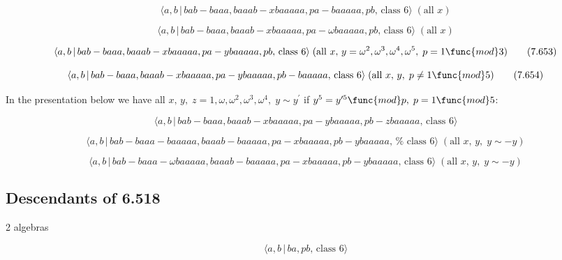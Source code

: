 \documentclass[10pt]{article}
\begin{document}
\begin{equation}
\langle a,b\,|\,bab-baaa,baaab-xbaaaaa,pa-baaaaa,pb,\,\text{class }6\rangle
\;(\text{all }x)  \tag{7.651}
\end{equation}

\begin{equation}
\langle a,b\,|\,bab-baaa,baaab-xbaaaaa,pa-\omega baaaaa,pb,\,\text{class }%
6\rangle \;(\text{all }x)  \tag{7.652}
\end{equation}

\begin{equation}
\langle a,b\,|\,bab-baaa,baaab-xbaaaaa,pa-ybaaaaa,pb,\,\text{class }6\rangle
\;(\text{all }x,\,y=\omega ^{2},\omega ^{3},\omega ^{4},\omega ^{5},\;p=1%
\func{mod}3)  \tag{7.653}
\end{equation}

\begin{equation}
\langle a,b\,|\,bab-baaa,baaab-xbaaaaa,pa-ybaaaaa,pb-baaaaa,\,\text{class }%
6\rangle \;(\text{all }x,\,y,\;p\neq 1\func{mod}5)  \tag{7.654}
\end{equation}

In the presentation below we have all $x,\,y,\;z=1,\omega ,\omega
^{2},\omega ^{3},\omega ^{4},\;y\sim y^{\prime }$ if $y^{5}=y^{\prime 5}%
\func{mod}p,\;p=1\func{mod}5$:

\begin{equation}
\langle a,b\,|\,bab-baaa,baaab-xbaaaaa,pa-ybaaaaa,pb-zbaaaaa,\,\text{class }%
6\rangle  \tag{7.655}
\end{equation}

\begin{equation}
\langle a,b\,|\,bab-baaa-baaaaa,baaab-baaaaa,pa-xbaaaaa,pb-ybaaaaa,\,\text{%
class }6\rangle \;(\text{all }x,\,y,\;y\sim -y)  \tag{7.656}
\end{equation}

\begin{equation}
\langle a,b\,|\,bab-baaa-\omega baaaaa,baaab-baaaaa,pa-xbaaaaa,pb-ybaaaaa,\,%
\text{class }6\rangle \;(\text{all }x,\,y,\;y\sim -y)  \tag{7.657}
\end{equation}

\subsection{Descendants of 6.518}

2 algebras

\begin{equation}
\langle a,b\,|\,ba,pb,\,\text{class }6\rangle  \tag{7.658}
\end{equation}
\end{document}
